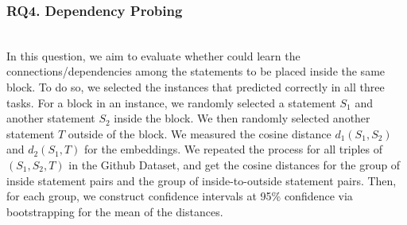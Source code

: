 \subsubsection{RQ4. Dependency Probing}~\\
In this question, we aim to evaluate whether {\tool} could learn the
connections/dependencies among the statements to be placed inside the
same  block. To do so, we selected the instances that
{\tool} predicted correctly in all three tasks. For a 
block in an instance, we randomly selected a statement $S_1$ and
another statement $S_2$ inside the block. We then randomly selected
another statement $T$ outside of the block. We measured the cosine distance
$d_1(S_1,S_2)$ and $d_2(S_1,T)$ for the embeddings. We repeated the
process for all triples of $(S_1,S_2,T)$ in the Github Dataset, and get the cosine distances for the group of 
inside statement pairs and the group of inside-to-outside statement pairs. Then, for each group, we construct confidence intervals at 
95\% confidence via bootstrapping for the mean of the distances.



 
